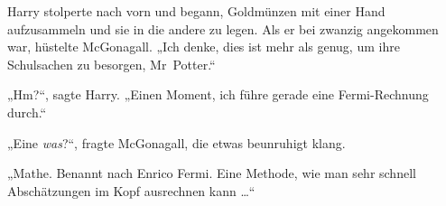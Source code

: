 

Harry stolperte nach vorn und begann, Goldmünzen mit einer Hand aufzusammeln und sie in die andere zu legen. Als er bei zwanzig angekommen war, hüstelte McGonagall.
„Ich denke, dies ist mehr als genug, um ihre Schulsachen zu besorgen, Mr~Potter.“

„Hm?“, sagte Harry.
„Einen Moment, ich führe gerade eine Fermi-Rechnung durch.“

„Eine \emph{was}?“, fragte McGonagall, die etwas beunruhigt klang.

„Mathe. Benannt nach Enrico Fermi. Eine Methode, wie man sehr schnell Abschätzungen im Kopf ausrechnen kann …“

